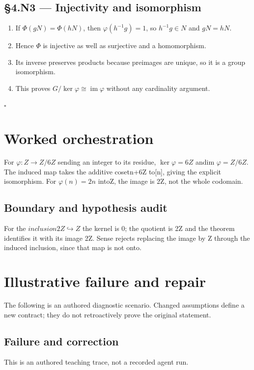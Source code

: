 \documentclass[preprint,12pt,aps,pra,showkeys,amsmath,amssymb,superscriptaddress,floatfix]{revtex4-2}
\theoremstyle{definition}
\theoremstyle{remark}
\begin{document}
\subsection{§4.N3 --- Injectivity and
isomorphism}\label{n3-injectivity-and-isomorphism}

\begin{enumerate}
\def\labelenumi{\arabic{enumi}.}
\item
  If \(\Phi (gN)=\Phi (hN)\), then \(\varphi (h^{-1}g)=1\), so
  \(h^{-1}g\in N\) and \(gN=hN\).
\item
  Hence \(\Phi\) is injective as well as surjective and a homomorphism.
\item
  Its inverse preserves products because preimages are unique, so it is
  a group isomorphism.
\item
  This proves
  \(G/\operatorname{ker} \varphi \cong \operatorname{im} \varphi\)
  without any cardinality argument.
\end{enumerate}

\hfill$\square$

\section{Worked orchestration}

For \(\varphi :Z\to Z/6Z\) sending an integer to its residue,
\(\operatorname{ker} \varphi =6Z\) andim \(\varphi =Z/6Z\). The induced
map takes the additive cosetn+6Z to{[}n{]}, giving the explicit
isomorphism. For \(\varphi (n)=2n\) intoZ, the image is 2Z, not the
whole codomain.

\subsection{Boundary and hypothesis audit}

For the \(inclusion2Z\hookrightarrow Z\) the kernel is 0; the quotient
is 2Z and the theorem identifies it with its image 2Z. Sense rejects
replacing the image by Z through the induced inclusion, since that map
is not onto.

\section{Illustrative failure and repair}

The following is an authored diagnostic scenario. Changed assumptions
define a new contract; they do not retroactively prove the original
statement.

\subsection{Failure and correction}
This is an authored teaching trace, not a recorded agent run.
\end{document}
